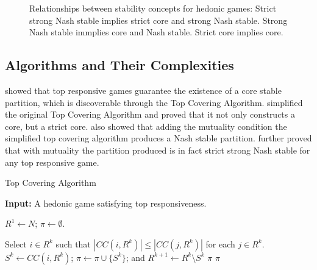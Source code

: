 \documentclass[letterpaper]{article} %
\begin{document}
\begin{figure}
\centering
{}
\caption{Relationships between stability concepts for hedonic games: Strict strong Nash stable implies strict core and strong Nash stable. Strong Nash stable immplies core and Nash stable. Strict core implies core.}
\end{figure}

\subsection{Algorithms and Their Complexities}

\cite{ALCALDE2004869} showed that top responsive games guarantee the existence of a core stable partition, which is discoverable through the Top Covering Algorithm. \cite{DIMITROV2007130} simplified the original Top Covering Algorithm and proved that it not only constructs a core, but a strict core. \cite{Dimitrov2006TopRA} also showed that adding the mutuality condition the simplified top covering algorithm produces a Nash stable partition. \cite{Aziz:2012:ESH:2343776.2343806} further proved that with mutuality the partition produced is in fact strict strong Nash stable for any top responsive game.

\begin{algorithm}[htb]
  \caption{Top Covering Algorithm}
  \label{alg:top_covering}
  \textbf{Input:} A hedonic game satisfying top responsiveness.

  \begin{algorithmic}[1]
\STATE $R^1 \leftarrow N$; $\pi \leftarrow \emptyset$.

\STATE \label{step:select} Select $i\in R^k$ such that $|CC(i,R^k)| \leq |CC(j,R^k)|$ for each $j\in R^k$.
\STATE $S^k\leftarrow  CC(i,R^k)$; $\pi \leftarrow  \pi \cup \lbrace S^k \rbrace$;  and $R^{k+1} \leftarrow  R^k \setminus S^k$
\RETURN $\pi$
\ENDIF
\ENDFOR
\RETURN $\pi$
 \end{algorithmic}
\end{algorithm}
\end{document}
